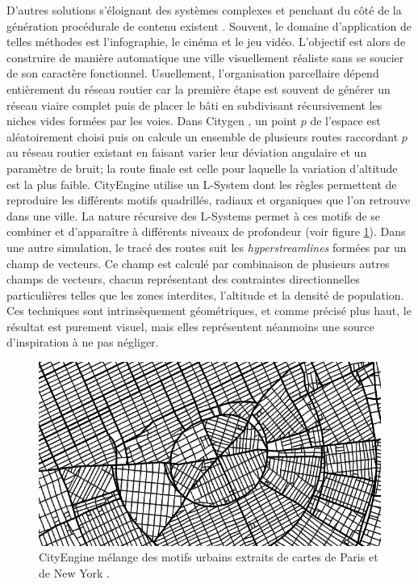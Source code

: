 \documentclass[12pt]{article}
\begin{document}
D'autres solutions s'éloignant des systèmes complexes et penchant du
côté de la génération procédurale de contenu existent
\cite{Kelly2006}. Souvent, le domaine d'application de telles méthodes
est l'infographie, le cinéma et le jeu vidéo. L'objectif est alors de
construire de manière automatique une ville visuellement réaliste sans
se soucier de son caractère fonctionnel. Usuellement, l'organisation
parcellaire dépend entièrement du réseau routier car la première étape
est souvent de générer un réseau viaire complet puis de placer le bâti
en subdivisant récursivement les niches vides formées par les
voies. Dans Citygen \cite{Kelly2006b}, un point $p$ de l'espace est
aléatoirement choisi puis on calcule un ensemble de plusieurs routes
raccordant $p$ au réseau routier existant en faisant varier leur
déviation angulaire et un paramètre de bruit; la route finale est
celle pour laquelle la variation d'altitude est la plus
faible. CityEngine \cite{Parish2001} utilise un L-System dont les
règles permettent de reproduire les différents motifs quadrillés,
radiaux et organiques que l'on retrouve dans une ville. La nature
récursive des L-Systems permet à ces motifs de se combiner et
d'apparaître à différents niveaux de profondeur (voir figure
\ref{fig:cityengine}). Dans une autre simulation, le tracé des routes
suit les \textit{hyperstreamlines} \cite{Chen2008} formées par un
champ de vecteurs. Ce champ est calculé par combinaison de plusieurs
autres champs de vecteurs, chacun représentant des contraintes
directionnelles particulières telles que les zones interdites,
l'altitude et la densité de population. Ces techniques sont
intrinsèquement géométriques, et comme précisé plus haut, le résultat
est purement visuel, mais elles représentent néanmoins une source
d'inspiration à ne pas négliger.

\begin{figure}[H]
  \centering
  \includegraphics[width=.8\linewidth]{images/cityengine.png}
  \caption{CityEngine mélange des motifs urbains extraits de cartes de
    Paris et de New York \cite{Parish2001}.}
  \label{fig:cityengine}
\end{figure}
\end{document}

